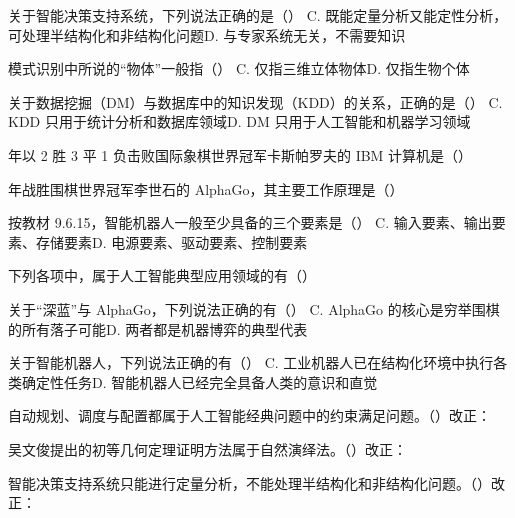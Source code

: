 \documentclass[a4paper,11pt]{article}
\begin{document}
\q 关于智能决策支持系统，下列说法正确的是（\quad）
{C. 既能定量分析又能定性分析，可处理半结构化和非结构化问题}{D. 与专家系统无关，不需要知识}

\q 模式识别中所说的“物体”一般指（\quad）
{C. 仅指三维立体物体}{D. 仅指生物个体}

\q 关于数据挖掘（DM）与数据库中的知识发现（KDD）的关系，正确的是（\quad）
{C. KDD 只用于统计分析和数据库领域}{D. DM 只用于人工智能和机器学习领域}

 年以 2 胜 3 平 1 负击败国际象棋世界冠军卡斯帕罗夫的 IBM 计算机是（\quad）

 年战胜围棋世界冠军李世石的 AlphaGo，其主要工作原理是（\quad）

\q 按教材 9.6.15，智能机器人一般至少具备的三个要素是（\quad）
{C. 输入要素、输出要素、存储要素}{D. 电源要素、驱动要素、控制要素}

\q 下列各项中，属于人工智能典型应用领域的有（\quad）

\q 关于“深蓝”与 AlphaGo，下列说法正确的有（\quad）
{C. AlphaGo 的核心是穷举围棋的所有落子可能}{D. 两者都是机器博弈的典型代表}

\q 关于智能机器人，下列说法正确的有（\quad）
{C. 工业机器人已在结构化环境中执行各类确定性任务}{D. 智能机器人已经完全具备人类的意识和直觉}

\q 自动规划、调度与配置都属于人工智能经典问题中的约束满足问题。\quad（\quad）\quad 改正：\fixblank

\q 吴文俊提出的初等几何定理证明方法属于自然演绎法。\quad（\quad）\quad 改正：\fixblank

\q 智能决策支持系统只能进行定量分析，不能处理半结构化和非结构化问题。\quad（\quad）\quad 改正：\fixblank
\end{document}
